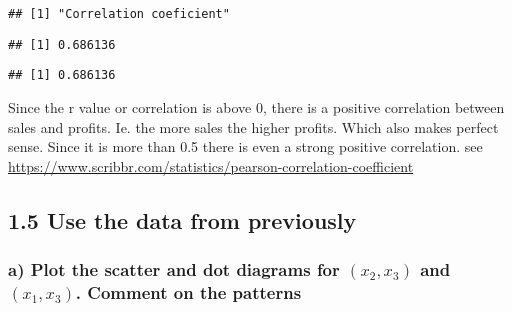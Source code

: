 \documentclass[
]{article}
\newenvironment{Shaded}{\begin{snugshade}}{\end{snugshade}}
\newcommand{\FunctionTok}[1]{\textcolor[rgb]{0.00,0.00,0.00}{#1}}
\newcommand{\NormalTok}[1]{#1}
\newcommand{\SpecialCharTok}[1]{\textcolor[rgb]{0.00,0.00,0.00}{#1}}
\begin{document}
\begin{verbatim}
## [1] "Correlation coeficient"
\end{verbatim}

\begin{Shaded}
\end{Shaded}

\begin{verbatim}
## [1] 0.686136
\end{verbatim}

\begin{Shaded}
\end{Shaded}

\begin{verbatim}
## [1] 0.686136
\end{verbatim}

Since the r value or correlation is above 0, there is a positive
correlation between sales and profits. Ie. the more sales the higher
profits. Which also makes perfect sense. Since it is more than 0.5 there
is even a strong positive correlation. see
\url{https://www.scribbr.com/statistics/pearson-correlation-coefficient}

\hypertarget{use-the-data-from-previously}{%
\subsection{1.5 Use the data from
previously}\label{use-the-data-from-previously}}

\hypertarget{a-plot-the-scatter-and-dot-diagrams-for-x_2-x_3-and-x_1-x_3.-comment-on-the-patterns}{%
\subsubsection{\texorpdfstring{a) Plot the scatter and dot diagrams for
\((x_2, x_3)\) and \((x_1, x_3)\). Comment on the
patterns}{a) Plot the scatter and dot diagrams for (x\_2, x\_3) and (x\_1, x\_3). Comment on the patterns}}\label{a-plot-the-scatter-and-dot-diagrams-for-x_2-x_3-and-x_1-x_3.-comment-on-the-patterns}}
\end{document}
